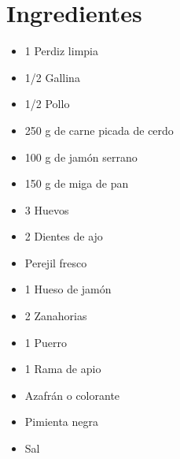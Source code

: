 

    \begin{minipage}[t]{0.35\textwidth}
        \small
        \section*{Ingredientes}
        \begin{itemize}[leftmargin=*, itemsep=1pt]
            \item 1 Perdiz limpia
            \item 1/2 Gallina
            \item 1/2 Pollo
            \item 250 g de carne picada de cerdo
            \item 100 g de jamón serrano
            \item 150 g de miga de pan
            \item 3 Huevos
            \item 2 Dientes de ajo
            \item Perejil fresco
            \item 1 Hueso de jamón
            \item 2 Zanahorias
            \item 1 Puerro
            \item 1 Rama de apio
            \item Azafrán o colorante
            \item Pimienta negra
            \item Sal
        \end{itemize}
    \end{minipage}
    \hfill
